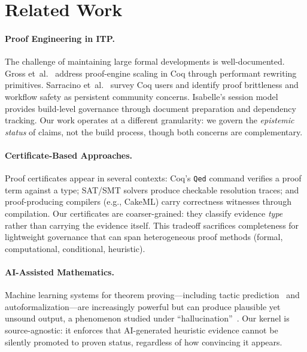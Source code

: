 \documentclass[runningheads]{llncs}
\begin{document}
\section{Related Work}
\label{sec:related}

\paragraph{Proof Engineering in ITP.}
The challenge of maintaining large formal developments is well-documented.
Gross et~al.~\cite{GrossEtAl2024} address proof-engine scaling in Coq through
performant rewriting primitives. Sarracino et~al.~\cite{CoqSurvey2025} survey
Coq users and identify proof brittleness and workflow safety as persistent
community concerns. Isabelle's session model~\cite{IsabelleSessions}
provides build-level governance through document preparation and dependency
tracking. Our work operates at a different granularity: we govern the
\emph{epistemic status} of claims, not the build process, though both
concerns are complementary.

\paragraph{Certificate-Based Approaches.}
Proof certificates appear in several contexts: Coq's
\texttt{Qed} command verifies a proof term against a type;
SAT/SMT solvers produce checkable resolution traces; and
proof-producing compilers (e.g., CakeML) carry correctness
witnesses through compilation.
Our certificates are coarser-grained: they classify evidence
\emph{type} rather than carrying the evidence itself.
This tradeoff sacrifices completeness for lightweight governance
that can span heterogeneous proof methods (formal,
computational, conditional, heuristic).

\paragraph{AI-Assisted Mathematics.}
Machine learning systems for theorem proving---including
tactic prediction~\cite{BlaauwbroekUrbanGeuvers2020} and
autoformalization---are increasingly powerful but can
produce plausible yet unsound output, a phenomenon studied
under ``hallucination''~\cite{FarrugiaEtAl2024}.
Our kernel is source-agnostic: it enforces that
AI-generated heuristic evidence cannot be silently promoted
to proven status, regardless of how convincing it appears.
\end{document}
